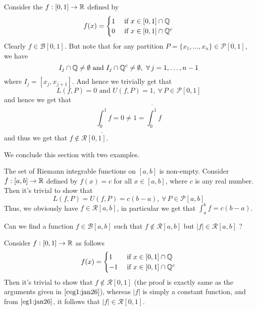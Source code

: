 \begin{cexample}\label{ceg1:jan26}
    Consider the  $f : [0,1] \to \mathbb{R}$ defined by 
    \[ f(x) = \begin{cases} 1 & \mbox{ if } x \in [0,1] \cap \mathbb{Q} \\ 0 & \mbox{ if } x \in [0,1] \cap \mathbb{Q}^c \end{cases} \]
    Clearly $f \in \mathcal{B}[0,1]$. But note that for any partition $P = \{x_1,\dots,x_n\} \in \mathcal{P}[0,1]$, we have \[ I_j \cap \mathbb{Q} \neq \emptyset \mbox{ and } I_j \cap \mathbb{Q}^c \neq \emptyset, \ \forall \, j = 1,\dots,n-1 \] where $I_j = [x_j,x_{j+1}]$. And hence we trivially get that \[ L(f,P) = 0 \mbox{ and } U(f,P) = 1, \ \forall \, P \in \mathcal{P}[0,1] \]
    and hence we get that 
    \[ \underline{\int_0^1} f = 0 \neq 1 = \overline{\int_0^1} f \]
    and thus we get that $f \notin \mathcal{R}[0,1]$.
\end{cexample}
We conclude this section with two examples.
\begin{example}\label{eg1:jan26}
    The set of Riemann integrable functions on $[a,b]$ is non-empty. Consider $ f : [a,b] \to \mathbb{R}$ defined by $f(x) = c$ for all $x \in [a,b]$, where $c$ is any real number. Then it's trivial to show that \[ L(f,P) = U(f,P) = c(b-a), \ \forall \, P \in \mathcal{P}[a,b] \]
    Thus, we obviously have $f \in \mathcal{R}[a,b]$, in particular we get that $ \int_a^b f = c(b-a) $.
\end{example}

\begin{example}\label{eg2:jan26}
    Can we find a function $f \in \mathcal{B}[a,b]$ such that $f \notin \mathcal{R}[a,b]$ but $|f| \in \mathcal{R}[a,b]$ ?

    Consider $f : [0,1] \to \mathbb{R}$ as follows \[ f(x) = \begin{cases}
        1 & \mbox{ if } x \in [0,1] \cap \mathbb{Q} \\ -1 & \mbox{ if } x \in [0,1] \cap \mathbb{Q}^c
    \end{cases} \]
    Then it's trivial to show that $f \notin \mathcal{R}[0,1]$ (the proof is exactly same as the arguments given in  $\ref{ceg1:jan26}$), whereas $|f|$ is simply a constant function, and from  $\ref{eg1:jan26}$, it follows that $|f| \in \mathcal{R}[0,1]$.
\end{example}